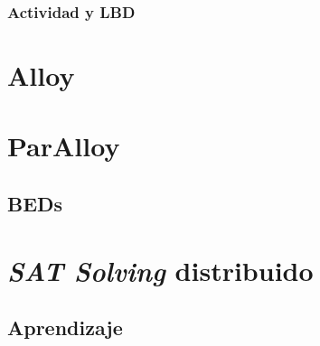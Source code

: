 \subsubsection{Actividad y LBD}

\section{Alloy}

\section{ParAlloy}
\subsection{BEDs}

\section{\emph{SAT Solving} distribuido}

\subsection{Aprendizaje}
